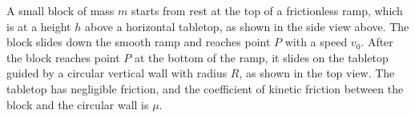\documentclass{../../oss-apphys-exam}
\begin{document}
\begin{questions}
  \newpage

  \question A small block of mass $m$ starts from rest at the top of a
  frictionless ramp, which is at a height $h$ above a horizontal tabletop, as
  shown in the side view above. The block slides down the smooth ramp and
  reaches point $P$ with a speed $v_0$. After the block reaches point $P$
  at the bottom of the ramp, it slides on the tabletop guided by a circular
  vertical wall with radius $R$, as shown in the top view. The tabletop has
  negligible friction, and the coefficient of kinetic friction between the
  block and the circular wall is $\mu$.
\end{questions}
\end{document}
